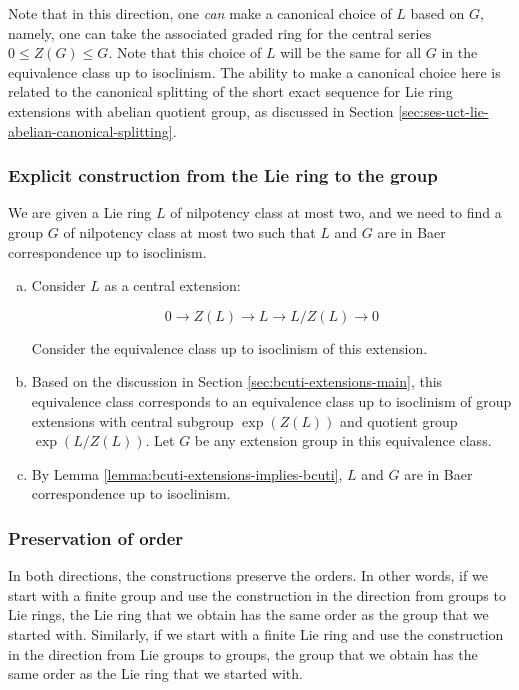 Note that in this direction, one {\em can} make a canonical choice of
$L$ based on $G$, namely, one can take the associated graded ring for
the central series $0 \le Z(G) \le G$. Note that this choice of $L$
will be the same for all $G$ in the equivalence class up to
isoclinism. The ability to make a canonical choice here is related to
the canonical splitting of the short exact sequence for Lie ring
extensions with abelian quotient group, as discussed in Section
\ref{sec:ses-uct-lie-abelian-canonical-splitting}.

\subsubsection{Explicit construction from the Lie ring to the group}

We are given a Lie ring $L$ of nilpotency class at most two, and we
need to find a group $G$ of nilpotency class at most two such that $L$
and $G$ are in Baer correspondence up to isoclinism.

\begin{enumerate}[(a)]
\item Consider $L$ as a central extension:

  $$0 \to Z(L) \to L \to L/Z(L) \to 0$$

  Consider the equivalence class up to isoclinism of this extension.

\item Based on the discussion in Section
  \ref{sec:bcuti-extensions-main}, this equivalence class corresponds
  to an equivalence class up to isoclinism of group extensions with
  central subgroup $\exp(Z(L))$ and quotient group $\exp(L/Z(L))$. Let
  $G$ be any extension group in this equivalence class.

\item By Lemma \ref{lemma:bcuti-extensions-implies-bcuti}, $L$ and $G$
  are in Baer correspondence up to isoclinism.
\end{enumerate}

\subsubsection{Preservation of order}\label{sec:bcuti-preserves-order}

In both directions, the constructions preserve the orders. In other
words, if we start with a finite group and use the construction in the
direction from groups to Lie rings, the Lie ring that we obtain has
the same order as the group that we started with. Similarly, if we
start with a finite Lie ring and use the construction in the direction
from Lie groups to groups, the group that we obtain has the same order
as the Lie ring that we started with.

